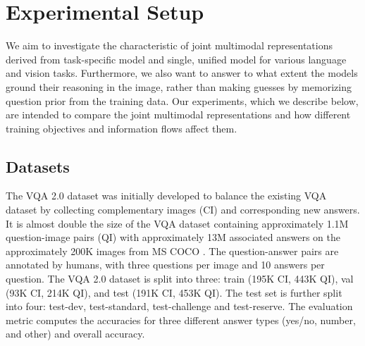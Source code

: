 \documentclass{article}
\begin{document}
\section{Experimental Setup}
We aim to investigate the characteristic of joint multimodal representations derived from task-specific model and single, unified model for various language and vision tasks. Furthermore, we also want to answer to what extent the models ground their reasoning in the image, rather than making guesses by memorizing question prior from the training data. Our experiments, which we describe below, are intended to compare the joint multimodal representations and how different training objectives and information flows affect them.


\subsection{Datasets} \label{subsection:datasets}

The VQA 2.0 dataset \citep{goyal2017vqa2} was initially developed to balance the existing VQA dataset \cite{antol2015vqa} by collecting complementary images (CI) and corresponding new answers. It is almost double the size of the VQA dataset containing approximately 1.1M question-image pairs (QI) with approximately 13M associated answers on the approximately 200K images from MS COCO \citep{coco}. The question-answer pairs are annotated by humans, with three questions per image and 10 answers per question. The VQA 2.0 dataset is split into three: train (195K CI, 443K QI), val (93K CI, 214K QI), and test (191K CI, 453K QI). The test set is further split into four: test-dev, test-standard, test-challenge and test-reserve. The evaluation metric computes the accuracies for three different answer types (yes/no, number, and other) and overall accuracy.
\end{document}
